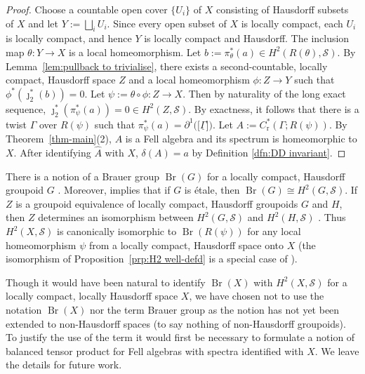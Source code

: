 \documentclass[12pt,a4paper]{amsart}
\newcommand{\red}{\operatorname{r}}
\newcommand{\Br}{\operatorname{Br}}
\newcommand{\Tgerms}{\mathcal{S}}
\newcommand{\tgcsa}[2]{\ensuremath{C^*_{\red}(#1 ; #2)}}
\begin{document}
\begin{proof}
Choose a countable open cover $\{U_i\}$ of $X$ consisting of
Hausdorff subsets of $X$ and let $Y:=\bigsqcup_i U_i$. Since
every open subset of $X$ is locally compact, each $U_i$ is
locally compact, and hence $Y$ is locally compact and
Hausdorff. The inclusion map $\theta:Y\to X$ is a local
homeomorphism. Let $b := \pi_\theta^*(a) \in
H^2(R(\theta),\Tgerms)$. By Lemma~\ref{lem:pullback to
trivialise}, there exists a second-countable, locally compact,
Hausdorff space $Z$ and a local homeomorphism $\phi : Z \to Y$
such that $\phi^*(\jmath^*_2(b)) = 0$. Let $\psi := \theta
\circ \phi : Z \to X$. Then by naturality of the long exact
sequence, $\jmath^*_2(\pi_\psi^*(a)) = 0 \in H^2(Z,\Tgerms)$.
By exactness, it follows that  there is a twist $\Gamma$ over
$R(\psi)$ such that $\pi_\psi^*(a)=
\partial^1\big(\!\big[\underline{\Gamma}\big]\!\big)$.
Let $A := \tgcsa{\Gamma}{R(\psi)}$. By Theorem~\ref{thm-main}(2), $A$ is
a Fell algebra and its spectrum is homeomorphic to $X$.
After identifying $\hat A$ with $X$, $\delta(A) = a$ by Definition \ref{dfn:DD invariant}.
\end{proof}

\begin{remark}\label{rmk:kudos to KMRW}
There is a notion of a Brauer group $\Br(G)$ for a locally
compact, Hausdorff groupoid $G$ \cite{KMRW}. Moreover,
\cite[Proposition~11.3]{KMRW} implies that if $G$ is \'etale,
then $\Br(G) \cong H^2(G, \Tgerms)$. If $Z$ is a groupoid
equivalence of locally compact, Hausdorff groupoids $G$ and
$H$, then $Z$ determines an isomorphism between $H^2(G,
\Tgerms)$ and $H^2(H, \Tgerms)$ \cite[Theorem~4.1]{KMRW}. Thus
$H^2(X, \Tgerms)$ is canonically isomorphic to $\Br(R(\psi))$ for any local
homeomorphism $\psi$ from a locally compact, Hausdorff space onto
$X$ (the isomorphism of Proposition~\ref{prp:H2 well-defd}
is a special case of \cite[Theorem~4.1]{KMRW}).

Though it would have been natural to identify $\Br(X)$ with
$H^2(X, \Tgerms)$ for a  locally compact, locally Hausdorff
space $X$, we have chosen not to use the notation $\Br(X)$ nor
the term Brauer group as the notion has not yet been extended
to non-Hausdorff spaces (to say nothing of non-Hausdorff
groupoids).   To justify the use of the term it  would first be
necessary to formulate a notion of balanced tensor product for
Fell algebras with spectra identified with $X$. We leave the
details for future work.
\end{remark}
\end{document}
